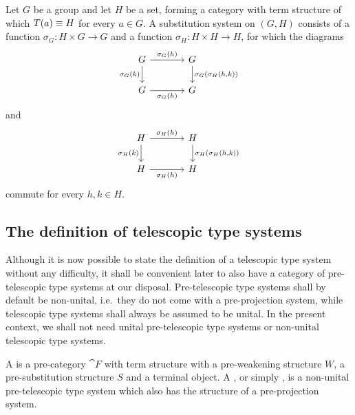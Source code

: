 \begin{eg}
Let $G$ be a group and let $H$ be a set, forming a category with term 
structure of which $T(a)\equiv H$ for every $a\in G$. A substitution
system on $(G,H)$ consists of a function $\sigma_G : H\times G\to G$ and
a function $\sigma_H:H\times H\to H$, for which the diagrams
\begin{equation*}
\begin{tikzcd}[column sep=large]
G \arrow[r,"\sigma_G(h)"]
  \arrow[d,swap,"\sigma_G(k)"]
  &
G \arrow[d,"{\sigma_G(\sigma_H(h,k))}"]
  \\
G \arrow[r,swap,"\sigma_G(h)"] 
& G
\end{tikzcd}
\end{equation*}
and
\begin{equation*}
\begin{tikzcd}[column sep=large]
H \arrow[r,"\sigma_H(h)"]
  \arrow[d,swap,"\sigma_H(k)"]
  &
H \arrow[d,"{\sigma_H(\sigma_H(h,k))}"]
  \\
H \arrow[r,swap,"\sigma_H(h)"]
  &
H
\end{tikzcd}
\end{equation*}
commute for every $h,k\in H$. 
\end{eg}

\subsection{The definition of telescopic type systems}

Although it is now possible to state the definition of a telescopic type system without
any difficulty, it shall be convenient later to also have a category of
pre-telescopic type systems at our disposal. Pre-telescopic type systems shall by default be non-unital,
i.e.~they do not come with a pre-projection system, while telescopic type systems shall
always be assumed to be unital. In the present context, we shall not need
unital pre-telescopic type systems or non-unital telescopic type systems.

\begin{defn}
A  is a pre-category $\cat{F}$ with term structure
with a pre-weakening structure $W$, a pre-substitution structure $S$ and a terminal
object. A , or simply , is a non-unital pre-telescopic type system which also has the structure of a pre-projection system. 
\end{defn}


